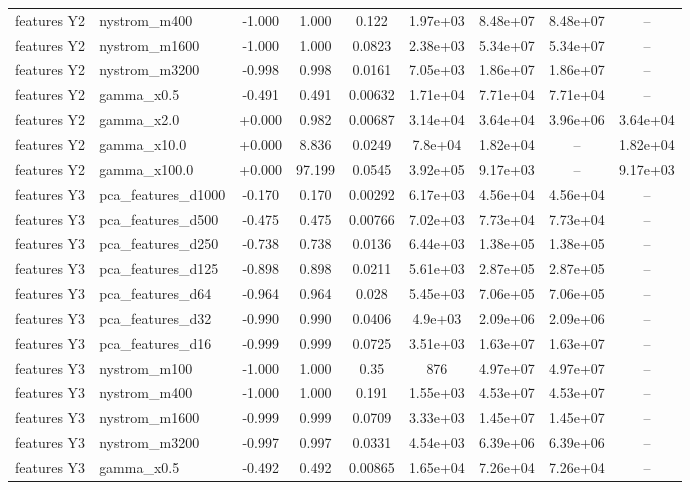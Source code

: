 \begin{tabular}{llccccccc}
features Y2 & nystrom\_m400 & -1.000 & 1.000 & 0.122 & 1.97e+03 & 8.48e+07 & 8.48e+07 & -- \\
features Y2 & nystrom\_m1600 & -1.000 & 1.000 & 0.0823 & 2.38e+03 & 5.34e+07 & 5.34e+07 & -- \\
features Y2 & nystrom\_m3200 & -0.998 & 0.998 & 0.0161 & 7.05e+03 & 1.86e+07 & 1.86e+07 & -- \\
features Y2 & gamma\_x0.5 & -0.491 & 0.491 & 0.00632 & 1.71e+04 & 7.71e+04 & 7.71e+04 & -- \\
features Y2 & gamma\_x2.0 & +0.000 & 0.982 & 0.00687 & 3.14e+04 & 3.64e+04 & 3.96e+06 & 3.64e+04 \\
features Y2 & gamma\_x10.0 & +0.000 & 8.836 & 0.0249 & 7.8e+04 & 1.82e+04 & -- & 1.82e+04 \\
features Y2 & gamma\_x100.0 & +0.000 & 97.199 & 0.0545 & 3.92e+05 & 9.17e+03 & -- & 9.17e+03 \\
features Y3 & pca\_features\_d1000 & -0.170 & 0.170 & 0.00292 & 6.17e+03 & 4.56e+04 & 4.56e+04 & -- \\
features Y3 & pca\_features\_d500 & -0.475 & 0.475 & 0.00766 & 7.02e+03 & 7.73e+04 & 7.73e+04 & -- \\
features Y3 & pca\_features\_d250 & -0.738 & 0.738 & 0.0136 & 6.44e+03 & 1.38e+05 & 1.38e+05 & -- \\
features Y3 & pca\_features\_d125 & -0.898 & 0.898 & 0.0211 & 5.61e+03 & 2.87e+05 & 2.87e+05 & -- \\
features Y3 & pca\_features\_d64 & -0.964 & 0.964 & 0.028 & 5.45e+03 & 7.06e+05 & 7.06e+05 & -- \\
features Y3 & pca\_features\_d32 & -0.990 & 0.990 & 0.0406 & 4.9e+03 & 2.09e+06 & 2.09e+06 & -- \\
features Y3 & pca\_features\_d16 & -0.999 & 0.999 & 0.0725 & 3.51e+03 & 1.63e+07 & 1.63e+07 & -- \\
features Y3 & nystrom\_m100 & -1.000 & 1.000 & 0.35 & 876 & 4.97e+07 & 4.97e+07 & -- \\
features Y3 & nystrom\_m400 & -1.000 & 1.000 & 0.191 & 1.55e+03 & 4.53e+07 & 4.53e+07 & -- \\
features Y3 & nystrom\_m1600 & -0.999 & 0.999 & 0.0709 & 3.33e+03 & 1.45e+07 & 1.45e+07 & -- \\
features Y3 & nystrom\_m3200 & -0.997 & 0.997 & 0.0331 & 4.54e+03 & 6.39e+06 & 6.39e+06 & -- \\
features Y3 & gamma\_x0.5 & -0.492 & 0.492 & 0.00865 & 1.65e+04 & 7.26e+04 & 7.26e+04 & -- \\

\end{tabular}
